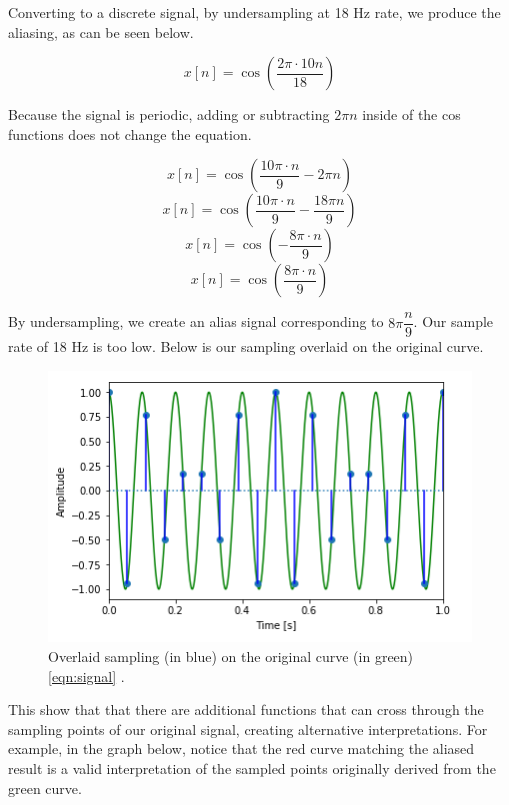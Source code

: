 Converting to a discrete signal, by undersampling at 18 Hz rate, we
produce the aliasing, as can be seen below.

\begin{equation}
	x[n]=\cos(\frac{2\pi \cdot 10n}{18})
\end{equation}

Because the signal is periodic, adding or subtracting $2\pi n$ 
inside of the cos functions does not change the equation.

\begin{equation}
	x[n]=\cos(\frac{10\pi \cdot n}{9} - 2\pi n)
\end{equation}
\begin{equation}
	x[n]=\cos(\frac{10\pi \cdot n}{9} - \frac{18\pi n}{9})
\end{equation}
\begin{equation}
	x[n]=\cos(-\frac{8\pi\cdot n}{9})
\end{equation}
\begin{equation}
	x[n]=\cos(\frac{8\pi\cdot n}{9})
\end{equation}

By undersampling, we create an alias signal corresponding to
\(8\pi\dfrac{n}{9}\). Our sample rate of 18 Hz is too low. Below
is our sampling overlaid on the original curve.

\begin{figure}[H]
	\centering
	\includegraphics[scale = 1]{sub_sample.png} %
	\caption{
		Overlaid sampling (in blue) on the original curve (in green) 
		\ref{eqn:signal} 
		\cite{notebook:sampling}.
	}
	\label{fig:sub_sample}
\end{figure}    

This show that that there are additional functions that can cross
through the sampling points of our original signal, creating
alternative interpretations. For example, in the graph below,
notice that the red curve matching the aliased result is a valid
interpretation of the sampled points originally derived from the
green curve.

